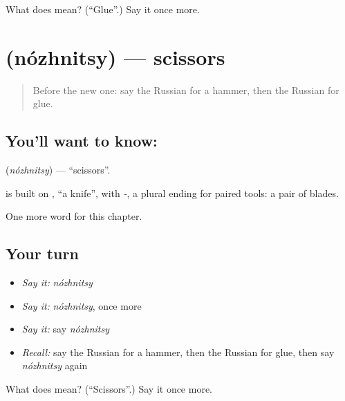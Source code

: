 \begin{tcolorbox}[breakable,colback=teal!4,colframe=teal!35!black,title={Before you move on}]
What does  mean? (\textquotedblleft{}Glue\textquotedblright{}.) Say it once more.
\end{tcolorbox}
\section[\texorpdfstring{\ru{ножницы} (nózhnitsy)}{ножницы (nózhnitsy)}]{ (nózhnitsy) — scissors}

\label{lesson:RU-C99-scissors}



\begin{quote}
Before the new one: say the Russian for a hammer, then the Russian for glue.
\end{quote}

\subsection*{You'll want to know: }
\textbf{} (\emph{nózhnitsy}) — \textquotedblleft{}scissors\textquotedblright{}.

\begin{cousinweb}
\textbf{} is built on \emph{}, \textquotedblleft{}a knife\textquotedblright{}, with \emph{-}, a plural ending for paired tools: a pair of blades.
\end{cousinweb}

\begin{grammarlens}[title={What you've built}]
One more word for this chapter.
\end{grammarlens}

\subsection*{Your turn}
\begin{itemize}
\raggedright
  \item \emph{Say it:} \emph{nózhnitsy}
  \item \emph{Say it:} \emph{nózhnitsy}, once more
  \item \emph{Say it:} say \emph{nózhnitsy}
  \item \emph{Recall:} say the Russian for a hammer, then the Russian for glue, then say \emph{nózhnitsy} again
\end{itemize}

\begin{tcolorbox}[breakable,colback=teal!4,colframe=teal!35!black,title={Before you move on}]
What does  mean? (\textquotedblleft{}Scissors\textquotedblright{}.) Say it once more.
\end{tcolorbox}
